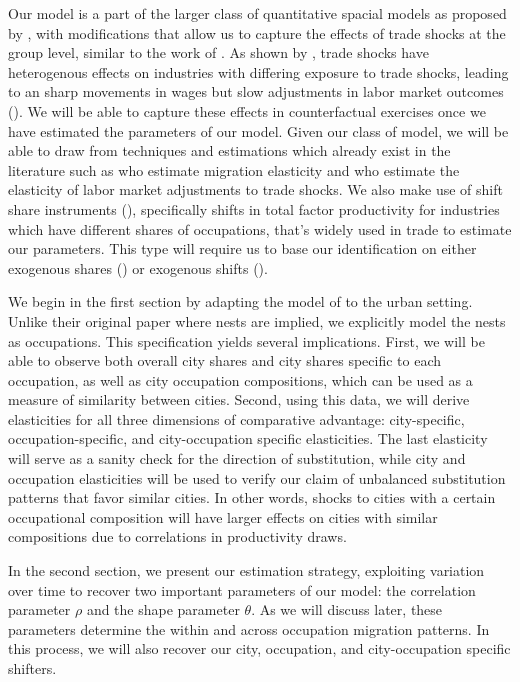 \documentclass[10pt]{article}
\begin{document}
Our model is a part of the larger class of quantitative spacial models as proposed by \cite{redding2017}, with modifications that allow us to capture the effects of trade shocks at the group level, similar to the work of \cite{galle2023}. As shown by \cite{adh2013}, trade shocks have heterogenous effects on industries with differing exposure to trade shocks, leading to an sharp movements in wages but slow adjustments in labor market outcomes (\cite{acm2010}). We will be able to capture these effects in counterfactual exercises once we have estimated the parameters of our model. Given our class of model, we will be able to draw from techniques and estimations which already exist in the literature such as \cite{albert_monras2022} who estimate migration elasticity and \cite{kim_vogel2020} who estimate the elasticity of labor market adjustments to trade shocks. We also make use of shift share instruments (\cite{bartik1991}), specifically shifts in total factor productivity for industries which have different shares of occupations, that's widely used in trade to estimate our parameters. This type will require us to base our identification on either exogenous shares (\cite{pssh2020}) or exogenous shifts (\cite{bhj2020}).

We begin in the first section by adapting the model of \cite{lindandramondo} to the urban setting. Unlike their original paper where nests are implied, we explicitly model the nests as occupations. This specification yields several implications. First, we will be able to observe both overall city shares and city shares specific to each occupation, as well as city occupation compositions, which can be used as a measure of similarity between cities. Second, using this data, we will derive elasticities for all three dimensions of comparative advantage: city-specific, occupation-specific, and city-occupation specific elasticities. The last elasticity will serve as a sanity check for the direction of substitution, while city and occupation elasticities will be used to verify our claim of unbalanced substitution patterns that favor similar cities. In other words, shocks to cities with a certain occupational composition will have larger effects on cities with similar compositions due to correlations in productivity draws.

In the second section, we present our estimation strategy, exploiting variation over time to recover two important parameters of our model: the correlation parameter $\rho$ and the shape parameter $\theta$. As we will discuss later, these parameters determine the within and across occupation migration patterns. In this process, we will also recover our city, occupation, and city-occupation specific shifters.
\end{document}
